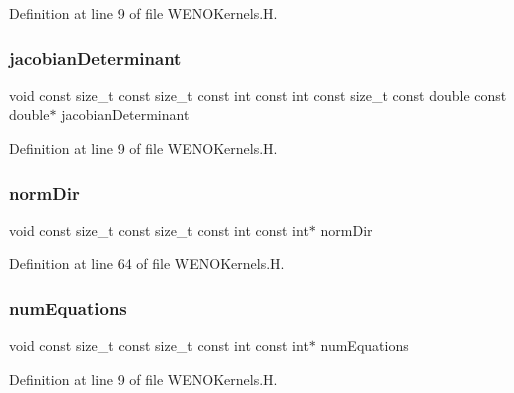 Definition at line 9 of file W\+E\+N\+O\+Kernels.\+H.

\hypertarget{WENOKernels_8H_a683cd3089fd3d704d36a88a01154d7a7}{}\label{WENOKernels_8H_a683cd3089fd3d704d36a88a01154d7a7} 
\subsubsection{\texorpdfstring{jacobian\+Determinant}{jacobianDeterminant}}
{\footnotesize\ttfamily void const size\+\_\+t const size\+\_\+t const int const int const size\+\_\+t const double const double$\ast$ jacobian\+Determinant}



Definition at line 9 of file W\+E\+N\+O\+Kernels.\+H.

\hypertarget{WENOKernels_8H_ab858ec0dee6bbc6698b28fe84576d1d1}{}\label{WENOKernels_8H_ab858ec0dee6bbc6698b28fe84576d1d1} 
\subsubsection{\texorpdfstring{norm\+Dir}{normDir}}
{\footnotesize\ttfamily void const size\+\_\+t const size\+\_\+t const int const int$\ast$ norm\+Dir}



Definition at line 64 of file W\+E\+N\+O\+Kernels.\+H.

\hypertarget{WENOKernels_8H_a118b6c5063941671714ad42ce6ccf62e}{}\label{WENOKernels_8H_a118b6c5063941671714ad42ce6ccf62e} 
\subsubsection{\texorpdfstring{num\+Equations}{numEquations}}
{\footnotesize\ttfamily void const size\+\_\+t const size\+\_\+t const int const int$\ast$ num\+Equations}



Definition at line 9 of file W\+E\+N\+O\+Kernels.\+H.

\hypertarget{WENOKernels_8H_aad16c16fe24d418263e6217978cf2070}{}\label{WENOKernels_8H_aad16c16fe24d418263e6217978cf2070} 

